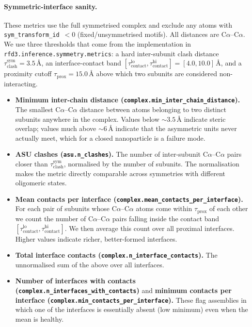 \documentclass{article}
\theoremstyle{plain}
\theoremstyle{definition}
\theoremstyle{remark}
\begin{document}
\paragraph{Symmetric-interface sanity.} These metrics use the full symmetrised complex and exclude any atoms with \texttt{sym\_transform\_id}~$<0$ (fixed/unsymmetrised motifs). All distances are C$\alpha$--C$\alpha$. We use three thresholds that come from the implementation in \texttt{rfd3.inference.symmetry.metrics}: a hard inter-subunit clash distance $\tau_\text{clash}^\text{sym}=3.5$\,\AA{}, an interface-contact band $[\tau_\text{contact}^\text{lo},\tau_\text{contact}^\text{hi}]=[4.0,10.0]$\,\AA{}, and a proximity cutoff $\tau_\text{prox}=15.0$\,\AA{} above which two subunits are considered non-interacting.
\begin{itemize}
  \item \textbf{Minimum inter-chain distance (\texttt{complex.min\_inter\_chain\_distance}).} The smallest C$\alpha$--C$\alpha$ distance between atoms belonging to two distinct subunits anywhere in the complex. Values below $\sim 3.5$\,\AA{} indicate steric overlap; values much above $\sim 6$\,\AA{} indicate that the asymmetric units never actually meet, which for a closed nanoparticle is a failure mode.
  \item \textbf{ASU clashes (\texttt{asu.n\_clashes}).} The number of inter-subunit C$\alpha$--C$\alpha$ pairs closer than $\tau_\text{clash}^\text{sym}$, normalised by the number of subunits. The normalisation makes the metric directly comparable across symmetries with different oligomeric states.
  \item \textbf{Mean contacts per interface (\texttt{complex.mean\_contacts\_per\_interface}).} For each pair of subunits whose C$\alpha$--C$\alpha$ atoms come within $\tau_\text{prox}$ of each other we count the number of C$\alpha$--C$\alpha$ pairs falling inside the contact band $[\tau_\text{contact}^\text{lo},\tau_\text{contact}^\text{hi}]$. We then average this count over all proximal interfaces. Higher values indicate richer, better-formed interfaces.
  \item \textbf{Total interface contacts (\texttt{complex.n\_interface\_contacts}).} The unnormalised sum of the above over all interfaces.
  \item \textbf{Number of interfaces with contacts (\texttt{complex.n\_interfaces\_with\_contacts})} and \textbf{minimum contacts per interface (\texttt{complex.min\_contacts\_per\_interface}).} These flag assemblies in which one of the interfaces is essentially absent (low minimum) even when the mean is healthy.
\end{itemize}
\end{document}
